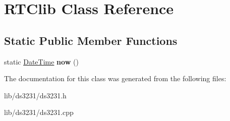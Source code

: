 \hypertarget{class_r_t_clib}{}\section{R\+T\+Clib Class Reference}
\label{class_r_t_clib}
\subsection*{Static Public Member Functions}
\begin{DoxyCompactItemize}
\item 
\mbox{\label{class_r_t_clib_af8ea6caa245cb5a6cf5edf4a6d3333f3}} 
static \hyperlink{class_date_time}{Date\+Time} {\bfseries now} ()
\end{DoxyCompactItemize}


The documentation for this class was generated from the following files\+:\begin{DoxyCompactItemize}
\item 
lib/ds3231/ds3231.\+h\item 
lib/ds3231/ds3231.\+cpp\end{DoxyCompactItemize}
